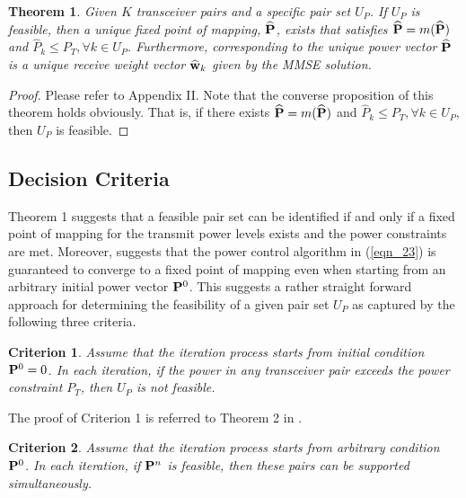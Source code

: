 \documentclass[draftcls,onecolumn,peerview,12pt]{IEEEtran}
\begin{document}
\newtheorem{theorem}{Theorem}
\begin{theorem}
Given $K$ transceiver pairs and a specific pair set $U_P$. If $U_P$
is feasible, then a unique fixed point of mapping, $\widehat{\rm{\bf
P}}$, exists that satisfies $\widehat{\rm{\bf P}}=m(\widehat{\rm{\bf
P}})$ and $\widehat{P}_k\leq P_T, \forall k \in U_P$. Furthermore,
corresponding to the unique power vector $\widehat{\rm{\bf P}}$ is a
unique receive weight vector $\widehat{\rm{\bf w}}_k$ given by the
MMSE solution.
\end{theorem}

\begin{proof}
Please refer to Appendix II. Note that the converse proposition of
this theorem holds obviously. That is, if there exists
$\widehat{\rm{\bf P}}=m(\widehat{\rm{\bf P}})$ and
$\widehat{P}_k\leq P_T, \forall k \in U_P$, then $U_P$ is feasible.
\end{proof}



\subsection{Decision Criteria}
Theorem 1 suggests that a feasible pair set can be identified if and
only if a fixed point of mapping for the transmit power levels
exists and the power constraints are met. Moreover,
\cite{13_JointOptimal1998} suggests that the power control algorithm
in (\ref{eqn_23}) is guaranteed to converge to a fixed point of
mapping even when starting from an arbitrary initial power vector
${\rm{\bf P}}^0$. This suggests a rather straight forward approach
for determining the feasibility of a given pair set $U_P$ as
captured by the following three criteria.

\newtheorem{criterion}{Criterion}
\begin{criterion}
Assume that the iteration process starts from initial condition
${\rm{\bf P}}^0 = 0$. In each iteration, if the power in any
transceiver pair exceeds the power constraint $P_T$, then $U_P$ is
not feasible.
\end{criterion}

The proof of Criterion 1 is referred to Theorem 2 in
\cite{13_JointOptimal1998}.

\begin{criterion}
Assume that the iteration process starts from arbitrary condition
${\rm{\bf P}}^0$. In each iteration, if ${\rm{\bf P}}^n$ is
feasible, then these pairs can be supported simultaneously.
\end{criterion}
\end{document}
